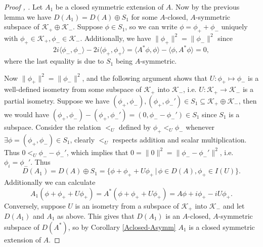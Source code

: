 \documentclass[12pt,oneside]{report}
\begin{document}
\begin{proof}[Proof \cite{simon_classical_1998}, \cite{Reed_Simon_1975}]
    Let $A_{1}$ be a closed symmetric extension of $A$. Now by the previous lemma we have $D(A_{1}) = D(A) \oplus S_{1}$ for some $A$-closed, $A$-symmetric subspace of $\mathscr{K}_{+} \oplus \mathscr{K}_{-}$. Suppose $\phi \in S_{1}$, so we can write $\phi = \phi_{+} + \phi_{-}$ uniquely with $\phi_{+} \in \mathscr{K}_{+}, \phi_{-} \in \mathscr{K}_{-}$. Additionally, we have $\|\phi_{+}\|^{2} = \|\phi_{-}\|^{2}$ since $$2i\langle\phi_{-},\phi_{-}\rangle - 2i\langle\phi_{+},\phi_{+}\rangle = \langle A^{*}\phi,\phi \rangle - \langle\phi,A^{*}\phi \rangle = 0,$$ where the last equality is due to $S_{1}$ being $A$-symmetric.

    Now $\|\phi_{+}\|^{2} = \|\phi_{-}\|^{2}$, and the following argument shows that $U: \phi_{+} \mapsto \phi_{-}$ is a well-defined isometry from some subspace of $\mathscr{K}_{+}$ into $\mathscr{K}_{-}$, i.e. $U: \mathscr{K}_{+} \to \mathscr{K}_{-}$ is a partial isometry. Suppose we have $(\phi_{+},\phi_{-}), (\phi_{+},\phi_{-}') \in S_{1} \subseteq \mathscr{K}_{+} \oplus \mathscr{K}_{-}$, then we would have $(\phi_{+},\phi_{-}) - (\phi_{+}, \phi_{-}') = (0, \phi_{-} - \phi_{-}') \in S_{1}$ since $S_{1}$ is a subspace. Consider the relation $<_{U}$ defined by $\phi_{+} <_{U} \phi_{-}$ whenever $\exists \phi = (\phi_{+},\phi_{-}) \in S_{1}$, clearly $<_{U}$ respects addition and scalar multiplication. Thus $0 <_{U} \phi_{-} - \phi_{-}'$, which implies that $0 = \|0\|^{2} = \|\phi_{-}-\phi_{-}'\|^{2}$, i.e. $\phi_{i} = \phi_{-}'$. Thus $$D(A_{1}) = D(A) \oplus S_{1} = \{ \phi + \phi_{+} + U\phi_{+} \, | \, \phi \in D(A), \phi_{+} \in I(U) \}.$$ Additionally we can calculate $$A_{1}(\phi+\phi_{+}+U\phi_{+}) = A^{*}(\phi+\phi_{+}+U\phi_{+}) = A\phi + i\phi_{+} - iU\phi_{+}.$$
    Conversely, suppose $U$ is an isometry from a subspace of $\mathscr{K}_{+}$ into $\mathscr{K}_{-}$ and let $D(A_{1})$ and $A_{1}$ as above. This gives that $D(A_{1})$ is an $A$-closed, $A$-symmetric subspace of $D(A^{*})$, so by Corollary \ref{Aclosed-Asymm} $A_{1}$ is a closed symmetric extension of $A$.


\end{proof}
\end{document}

